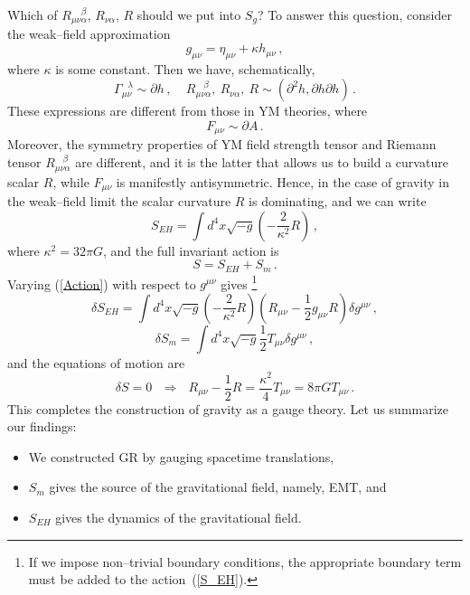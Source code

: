 \documentclass[12pt]{article}
\begin{document}
Which of $R_{\mu\nu\alpha}^{~~~~~\beta}$, $R_{\nu\alpha}$, $R$ should we put into $S_g$? To answer this question, consider the weak--field approximation
\begin{equation}
g_{\mu\nu}=\eta_{\mu\nu}+\kappa h_{\mu\nu} \,,
\end{equation}
where $\kappa$ is some constant. Then we have, schematically,
\begin{equation}
\Gamma_{\mu\nu}^{~~~\lambda}\sim\partial h \,,~~~~~R_{\mu\nu\alpha}^{~~~~\beta}, ~R_{\nu\alpha},~R\sim (\partial^2 h, \partial h\partial h) \,.
\end{equation}
These expressions are different from those in YM theories, where
\begin{equation}
F_{\mu\nu}\sim\partial A \,.
\end{equation}
Moreover, the symmetry properties of YM field strength tensor and Riemann tensor $R_{\mu\nu\alpha}^{~~~~\beta}$ are different, and it is the latter that allows us to build a curvature scalar $R$, while $F_{\mu\nu}$ is manifestly antisymmetric. Hence, in the case of gravity in the weak--field limit the scalar curvature $R$ is dominating, and we can write
\begin{equation}\label{S_EH}
S_{EH}=\int d^4x\sqrt{-g}\left(-\dfrac{2}{\kappa^2}R\right) \,,
\end{equation}
where $\kappa^2=32\pi G$, and the full invariant action is
\begin{equation}\label{Action}
S=S_{EH}+S_m \,.
\end{equation}
Varying (\ref{Action}) with respect to $g^{\mu\nu}$ gives \footnote{If we impose non--trivial boundary conditions, the appropriate boundary term must be added to the action~(\ref{S_EH}).}
\begin{equation}
\delta S_{EH}=\int d^4x\sqrt{-g}\left(-\dfrac{2}{\kappa^2}R\right)\left(R_{\mu\nu}-\dfrac{1}{2}g_{\mu\nu}R\right)\delta g^{\mu\nu} \,,
\end{equation}
\begin{equation}
\delta S_m=\int d^4x\sqrt{-g}\dfrac{1}{2}T_{\mu\nu}\delta g^{\mu\nu} \,,
\end{equation}
and the equations of motion are
\begin{equation}
\delta S=0~~~\Rightarrow~~~ R_{\mu\nu}-\dfrac{1}{2}R=\dfrac{\kappa^2}{4}T_{\mu\nu}=8\pi GT_{\mu\nu} \,.
\end{equation}
This completes the construction of gravity as a gauge theory. Let us summarize our findings:
\begin{itemize}
\item We constructed GR by gauging spacetime translations,
\item $S_m$ gives the source of the gravitational field, namely, EMT, and
\item $S_{EH}$ gives the dynamics of the gravitational field.
\end{itemize}
\end{document}

